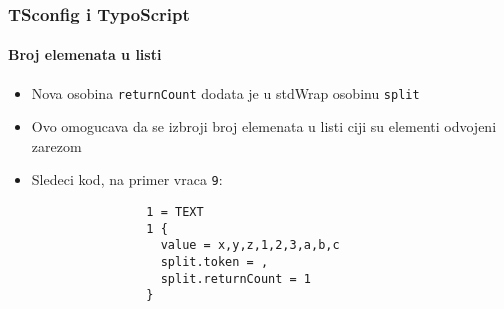 
\begin{frame}[fragile]
	\frametitle{TSconfig i TypoScript}
	\framesubtitle{Broj elemenata u listi}

	\lstset{basicstyle=\tiny\ttfamily}

	\begin{itemize}

		\item Nova osobina \texttt{returnCount} dodata je u stdWrap osobinu \texttt{split}

		\item Ovo omogucava da se izbroji broj elemenata u listi ciji su elementi odvojeni zarezom

		\item Sledeci kod, na primer vraca \texttt{9}:

			\begin{lstlisting}
				1 = TEXT
				1 {
				  value = x,y,z,1,2,3,a,b,c
				  split.token = ,
				  split.returnCount = 1
				}
			\end{lstlisting}

	\end{itemize}

\end{frame}


